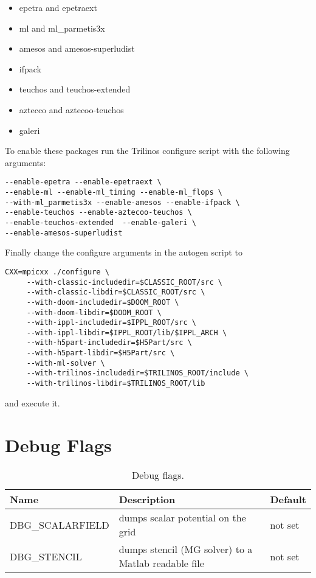 \begin{itemize}
  \item epetra and epetraext
  \item ml and ml\_parmetis3x
  \item amesos and amesos-superludist
  \item ifpack
  \item teuchos and teuchos-extended
  \item aztecco and aztecoo-teuchos
  \item galeri 
\end{itemize}
To enable these packages run the Trilinos configure script with the following arguments:
\begin{verbatim}
--enable-epetra --enable-epetraext \
--enable-ml --enable-ml_timing --enable-ml_flops \
--with-ml_parmetis3x --enable-amesos --enable-ifpack \
--enable-teuchos --enable-aztecoo-teuchos \
--enable-teuchos-extended  --enable-galeri \
--enable-amesos-superludist
\end{verbatim}
Finally change the configure arguments in the \opal autogen script to
\begin{verbatim}
CXX=mpicxx ./configure \
     --with-classic-includedir=$CLASSIC_ROOT/src \
     --with-classic-libdir=$CLASSIC_ROOT/src \
     --with-doom-includedir=$DOOM_ROOT \
     --with-doom-libdir=$DOOM_ROOT \
     --with-ippl-includedir=$IPPL_ROOT/src \
     --with-ippl-libdir=$IPPL_ROOT/lib/$IPPL_ARCH \
     --with-h5part-includedir=$H5Part/src \
     --with-h5part-libdir=$H5Part/src \
     --with-ml-solver \
     --with-trilinos-includedir=$TRILINOS_ROOT/include \
     --with-trilinos-libdir=$TRILINOS_ROOT/lib
\end{verbatim}
and execute it.

\section{Debug Flags}\label{sec:debugflags}

\begin{table}[ht]\footnotesize
\caption{Debug flags.}
\label{tbl:debug_flags}
\begin{center}
\begin{tabular}{lll}
\hline
{\bf Name} & {\bf Description} & {\bf Default} \\
\hline
DBG\_SCALARFIELD & dumps scalar potential on the grid & not set \\
DBG\_STENCIL & dumps stencil (MG solver) to a Matlab readable file & not set \\
\hline
\end{tabular}
\end{center}
\end{table}

